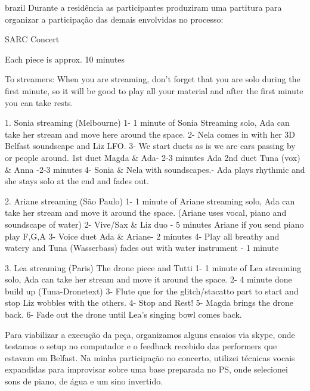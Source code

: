 \begin{otherlanguage*}{brazil}
Durante a residência as participantes produziram uma partitura para organizar a participação das demais envolvidas no processo:

\begin{citacao}


SARC Concert

Each piece is approx. 10 minutes

To streamers: When you are streaming, don’t forget that you are solo during the first minute, so it will be good to play all your material and after the first minute you can take rests. 



1. Sonia streaming (Melbourne) 
1- 1 minute of  Sonia Streaming solo, Ada can take her stream and move here around the space. 
2-  Nela comes in with her 3D Belfast soundscape and Liz LFO. 
3-  We start duets as is we are cars passing by or people around. 
    1st duet Magda \& Ada- 2-3 minutes Ada 
    2nd duet Tuna (vox) \& Anna -2-3 minutes 
4- Sonia \& Nela with soundscapes.- Ada plays rhythmic and she stays solo at the end and fades out. 


2. Ariane streaming (São Paulo) 
1- 1 minute of  Ariane streaming solo, Ada can take her stream and move it around the space. (Ariane uses vocal, piano and soundscape of water)
2- Vive/Sax \& Liz duo - 5 minutes 
Ariane if you send piano play F,G,A
3- Voice duet  Ada \& Ariane- 2 minutes 
4- Play all breathy and watery  and Tuna (Wasserbass) fades out with water instrument - 1 minute   

3. Lea streaming (Paris) The drone piece and Tutti 
1- 1 minute of  Lea streaming solo, Ada can take her stream and move it around the space. 
2- 4 minute done build up (Tuna-Dronetext)
3- Flute que for the glitch/stacatto part to start and stop
Liz wobbles with the others. 
4- Stop and Rest!
5- Magda brings the drone back.
6- Fade out the drone until Lea’s singing bowl comes back. 
\end{citacao}

Para viabilizar a execução da peça, organizamos alguns ensaios via skype, onde testamos o setup no computador e o feedback recebido das performers que estavam em Belfast. Na minha participação no concerto, utilizei técnicas vocais expandidas para improvisar sobre uma base preparada no PS, onde selecionei sons de piano, de água e um sino invertido. 


\end{otherlanguage*}
